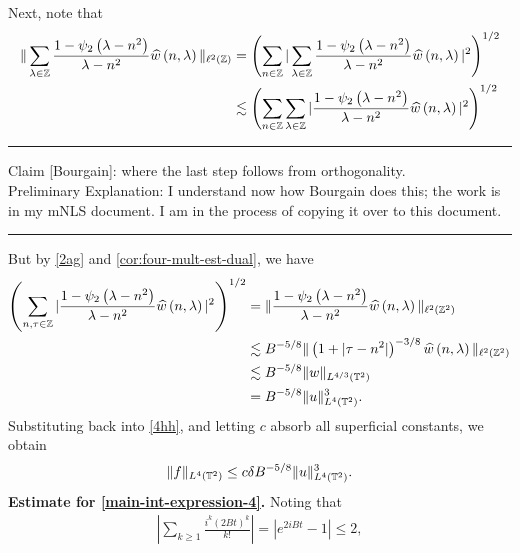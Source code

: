 %
%
Next, note 
that 
%
%
\begin{equation}
	\label{apply-ortho}
	\begin{split}
		\|\sum_{\lambda \in \mathbb{Z}}
		\frac{1 - \psi_2\left( \lambda - n^2 \right)}{\lambda - n^2} \widehat{w} 
		\left( n, \lambda \right) \|_{\ell^2\left( \mathbb{Z} \right)}
		& = \left( \sum_{n \in \mathbb{Z}}  | \sum_{\lambda \in \mathbb{Z}}
		\frac{1 - \psi_2\left( \lambda - n^2 \right)}{\lambda - n^2} \widehat{w} 
		\left( n, \lambda \right) |^2 \right )^{1/2}
		\\
		& \lesssim \left( \sum_{n \in \mathbb{Z}} \sum_{\lambda \in \mathbb{Z}} |
		\frac{1 - \psi_2\left( \lambda - n^2 \right)}{\lambda - n^2} 
		\widehat{w}\left( n, \lambda \right) |^2 
		\right)^{1/2} 
	\end{split}
\end{equation}
%
%
\hrule
Claim [Bourgain]: where the last step follows from orthogonality. 
\\
Preliminary Explanation: I understand now how Bourgain does this; the work is in 
my mNLS document. I am in the process of copying it over to this document.
\\
\hrule
%
%
But by \eqref{2ag} and \cref{cor:four-mult-est-dual}, we have
\begin{equation*}
	\begin{split}
		\left( \sum_{n, \tau \in \mathbb{Z}} |
		\frac{1 - \psi_2\left( \lambda - n^2 \right)}{\lambda - n^2} 
		\widehat{w}\left( n, \lambda \right) |^2 
		\right)^{1/2}
		& = \|\frac{1 - \psi_2 \left( \lambda - n^2 
		\right)}{\lambda - n^2} \widehat{w}\left( n, \lambda \right) 
		\|_{\ell^2(\mathbb{Z}^2)}
		\\
		& \lesssim B^{-5/8} \|\left( 1 + |\tau - n^2| \right)^{-3/8} 
		\widehat{w}\left( n, \lambda \right) \|_{\ell^2(\mathbb{Z}^2)}
		\\
		& \lesssim B^{-5/8} \|w\|_{L^{4/3}(\mathbb{T}^2)}
		\\
		& = B^{-5/8} \|u\|_{L^4(\mathbb{T}^2)}^3.
	\end{split}
\end{equation*}
%
%
Substituting back into \eqref{4hh}, and letting $c$ absorb all superficial 
constants, we obtain
%
%
\begin{equation}
	\label{main-int-3-est}
	\begin{split}
		\|f\|_{L^4(\mathbb{T}^2)} \le c \delta B^{-5/8} 
		\|u\|_{L^4(\mathbb{T}^2)}^3.
	\end{split}
\end{equation}
%
%
\textbf{Estimate for \eqref{main-int-expression-4}.}
Noting that
%
%
\begin{equation*}
	\begin{split}
		|\sum_{k \ge 1} \frac{i^k (2Bt)^k}{k!}| = |e^{2iBt} - 1| \le 2,
	\end{split}
\end{equation*}

